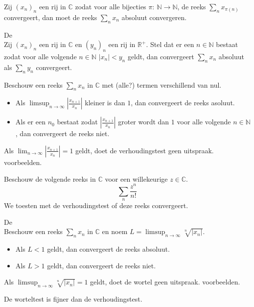 \documentclass[main.tex]{subfiles}
\begin{document}
\begin{st}
  Zij $(x_{n})_{n}$ een rij in $\mathbb{C}$ zodat voor alle bijecties $\pi:\ \mathbb{N} \rightarrow \mathbb{N}$, de reeks $\sum_{n}x_{\pi(n)}$ convergeert, dan moet de reeks $\sum_{n}x_{n}$ absoluut convergeren.
\end{st}

\begin{bst}
  De \\
  Zij $(x_{n})_{n}$ een rij in $\mathbb{C}$ en $(y_{n})_{n}$ een rij in $\mathbb{R}^{+}$.
  Stel dat er een $n\in \mathbb{N}$ bestaat zodat voor alle volgende $n\in \mathbb{N}$ $|x_{n}| < y_{n}$ geldt, dan convergeert $\sum_{n}x_{n}$ absoluut als $\sum_{n}y_{n}$ convergeert.
\end{bst}

\begin{st}
  Beschouw een reeks $\sum_{n}x_{n}$ in $\mathbb{C}$ met (alle?) termen verschillend van nul.
  \begin{itemize}
  \item Als $\limsup_{n\rightarrow \infty}\left| \frac{x_{n+1}}{x_{n}}\right|$ kleiner is dan $1$, dan convergeert de reeks asoluut.
  \item Als er een $n_{0}$ bestaat zodat $\left| \frac{x_{n+1}}{x_{n}}\right|$ groter wordt dan $1$ voor alle volgende $n\in \mathbb{N}$, dan convergeert de reeks niet.
  \end{itemize}
\end{st}

\begin{opm}
  Als $\lim_{n\rightarrow \infty}\left|\frac{x_{n+1}}{x_{n}}\right| = 1$ geldt, doet de verhoudingstest geen uitspraak.
 voorbeelden.
\end{opm}

\begin{vb}
  Beschouw de volgende reeks in $\mathbb{C}$ voor een willekeurige $z\in \mathbb{C}$.
  \[ \sum_{n}\frac{z^{n}}{n!} \]
  We toesten met de verhoudingstest of deze reeks convergeert.
\end{vb}

\begin{st}
  De \\
  Beschouw een reeks $\sum_{n}x_{n}$ in $\mathbb{C}$ en noem $L= \limsup_{n\rightarrow \infty}\sqrt[n]{|x_{n}|}$.
  \begin{itemize}
  \item Als $L<1$ geldt, dan convergeert de reeks absoluut.
  \item Als $L>1$ geldt, dan convergeert de reeks niet.
  \end{itemize}
\end{st}

\begin{opm}
  Als $\limsup_{n\rightarrow \infty}\sqrt[n]{|x_{n}|}= 1$ geldt, doet de wortel geen uitspraak.
 voorbeelden.
\end{opm}


\begin{st}
  De worteltest is fijner dan de verhoudingstest.
\end{st}
\end{document}
